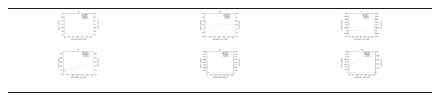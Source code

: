 \documentclass[preprint,3p]{elsarticle}
\begin{document}
\begin{figure}[!t]
\centering
\begin{tabular}{ccc}
  \includegraphics[width=0.32\textwidth]{images/HighMutRatio_150000/F2_50_HighMutRatio.eps} & \includegraphics[width=0.32\textwidth]{images/HighMutRatio_150000/F3_50_HighMutRatio} & \includegraphics[width=0.32\textwidth]{images/HighMutRatio_150000/F4_50_HighMutRatio} \\
  \includegraphics[width=0.32\textwidth]{images/HighMutRatio_150000/F8_50_HighMutRatio} & \includegraphics[width=0.32\textwidth]{images/HighMutRatio_150000/F9_50_HighMutRatio} & \includegraphics[width=0.32\textwidth]{images/HighMutRatio_150000/F10_50_HighMutRatio} \\ \\

\end{tabular}
\end{figure}
\end{document}
